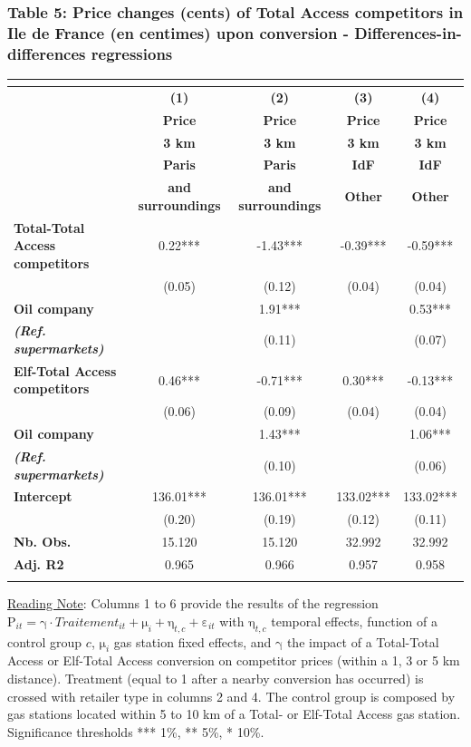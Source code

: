 \documentclass[english]{article}
\begin{document}
\medskip{}

\subsubsection*{Table 5: Price changes (cents) of Total Access competitors
in Ile de France (en centimes) upon conversion - Differences-in-differences regressions}

\begin{center}
\begin{footnotesize} %
\begin{tabular}{l|cccc}
\multicolumn{1}{l}{} &  &  &  & \tabularnewline
\hline
\hline
 & \textbf{(1)}  & \textbf{(2)}  & \textbf{(3)}  & \textbf{(4) }\tabularnewline
 & \textbf{Price}  & \textbf{Price}  & \textbf{Price}  & \textbf{Price}\tabularnewline
 & \textbf{3 km}  & \textbf{3 km}  & \textbf{3 km}  & \textbf{3 km}\tabularnewline
\hline
 & \textbf{Paris}  & \textbf{Paris}  & \textbf{IdF}  & \textbf{IdF}\tabularnewline
 & \textbf{and surroundings}  & \textbf{and surroundings}  & \textbf{Other}  & \textbf{Other}\tabularnewline
\hline
\textbf{Total-Total Access competitors}  & 0.22{*}{*}{*}  & -1.43{*}{*}{*}  & -0.39{*}{*}{*}  & -0.59{*}{*}{*}\tabularnewline
 & (0.05)  & (0.12)  & (0.04)  & (0.04)\tabularnewline
\textbf{Oil company}  &  & 1.91{*}{*}{*}  &  & 0.53{*}{*}{*}\tabularnewline
\textbf{\textit{(Ref. supermarkets)}}  &  & (0.11)  &  & (0.07)\tabularnewline
\hline
\textbf{Elf-Total Access competitors}  & 0.46{*}{*}{*}  & -0.71{*}{*}{*}  & 0.30{*}{*}{*}  & -0.13{*}{*}{*}\tabularnewline
 & (0.06)  & (0.09)  & (0.04)  & (0.04)\tabularnewline
\textbf{Oil company}  &  & 1.43{*}{*}{*}  &  & 1.06{*}{*}{*}\tabularnewline
\textbf{\textit{(Ref. supermarkets)}}  &  & (0.10)  &  & (0.06)\tabularnewline
\hline
\textbf{Intercept}  & 136.01{*}{*}{*}  & 136.01{*}{*}{*}  & 133.02{*}{*}{*}  & 133.02{*}{*}{*}\tabularnewline
 & (0.20)  & (0.19)  & (0.12)  & (0.11)\tabularnewline
\hline
\textbf{Nb. Obs.}  & 15.120  & 15.120  & 32.992  & 32.992\tabularnewline
\textbf{Adj. R2}  & 0.965  & 0.966  & 0.957  & 0.958\tabularnewline
\hline
\hline
\multicolumn{1}{l}{} &  &  &  & \tabularnewline
\end{tabular}\end{footnotesize}
\par\end{center}

{\small{}\uline{Reading Note}}{\small{}: } Columns 1 to 6 provide the results of the regression $\mathrm{P}_{it}=\mathrm{\gamma}\cdot Traitement_{it}+\mathrm{\mu}_{i}+\mathrm{\eta}_{t,c}+\mathrm{\varepsilon}_{it}$
with $\mathrm{\eta}_{t,c}$ temporal effects, function of a control group $c$, $\mathrm{\mu}_{i}$ gas station fixed effects, and $\mathrm{\gamma}$ the impact of a Total-Total Access or Elf-Total Access conversion on competitor prices (within a 1, 3 or 5 km distance). Treatment (equal to 1 after a nearby conversion has occurred) is crossed with retailer type in columns 2 and 4. The control group is composed by gas stations located within 5 to 10 km of a Total- or Elf-Total Access gas station. Significance thresholds {*}{*}{*} 1\%, {*}{*} 5\%, {*} 10\%.\medskip{}
\end{document}
